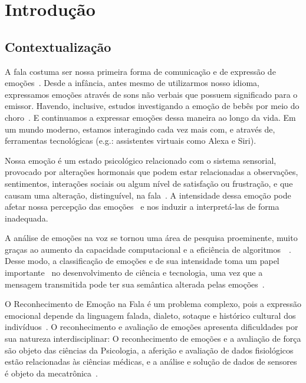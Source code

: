 \chapter{Introdução}\label{Cap:Introdução}

\section{Contextualização}

A fala costuma ser nossa primeira forma de comunicação e de expressão de emoções~\cite{1.5}. Desde a infância, antes mesmo de utilizarmos nosso idioma, expressamos emoções através de sons não verbais que possuem significado para o emissor. Havendo, inclusive, estudos investigando a emoção de bebês por meio do choro~\cite{0}. E continuamos a expressar emoções dessa maneira ao longo da vida. Em um mundo moderno, estamos interagindo cada vez mais com, e através de, ferramentas tecnológicas (e.g.: assistentes virtuais como Alexa e Siri).

Nossa emoção é um estado psicológico relacionado com o sistema sensorial, provocado por alterações hormonais que podem estar relacionadas a observações, sentimentos, interações sociais ou algum nível de satisfação ou frustração, e que causam uma alteração, distinguível, na fala~\cite{8}. A intensidade dessa emoção pode afetar nossa percepção das emoções~\cite{18.46} e nos induzir a interpretá-las de forma inadequada.

A análise de emoções na voz se tornou uma área de pesquisa proeminente, muito graças ao aumento da capacidade computacional e a eficiência de algoritmos~\cite{38}~\cite{20}. Desse modo, a classificação de emoções e de sua intensidade toma um papel importante~\cite{3} no desenvolvimento de ciência e tecnologia, uma vez que a mensagem transmitida pode ter sua semântica alterada pelas emoções~\cite{39}.

O Reconhecimento de Emoção na Fala é um problema complexo, pois a expressão emocional depende da linguagem falada, dialeto, sotaque e histórico cultural dos indivíduos~\cite{6}. O reconhecimento e avaliação de emoções apresenta dificuldades por sua natureza interdisciplinar: O reconhecimento de emoções e a avaliação de força são objeto das ciências da Psicologia, a aferição e avaliação de dados fisiológicos estão relacionadas às ciências médicas, e a análise e solução de dados de sensores é objeto da mecatrônica~\cite{17}.

